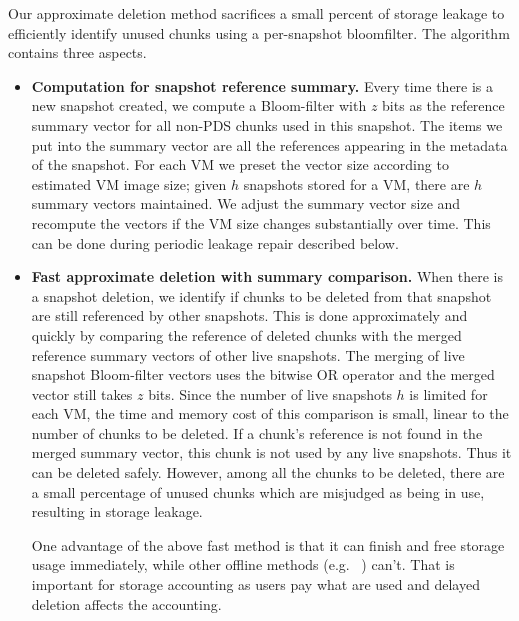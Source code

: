 Our approximate deletion method sacrifices a small percent of storage leakage
to efficiently identify unused chunks using a per-snapshot bloomfilter.
The algorithm contains three aspects.
\begin{itemize}
\item {\bf Computation for snapshot reference summary.}
Every time there is a new snapshot created,
we compute a Bloom-filter with $z$ bits as the reference summary vector for all non-PDS chunks used 
in this snapshot.
The items we put into the summary vector are all the references appearing in the metadata of the snapshot.
For each VM we preset the vector size according to estimated VM image size;
given $h$ snapshots stored for a VM, there are $h$ summary vectors maintained.
We adjust the summary vector size and recompute the vectors if the VM size changes substantially over time.
This can be done during periodic leakage repair described below.

\item {\bf Fast approximate deletion with summary comparison.}
When there is a snapshot deletion,  
we identify if chunks to be deleted from that snapshot
are still referenced by other snapshots. 
This is done approximately and quickly by comparing the 
reference of deleted chunks  with
the merged reference summary vectors of other live snapshots.
The merging of live snapshot Bloom-filter vectors uses the bitwise OR operator 
and the merged vector still takes $z$ bits.
Since the number of live snapshots $h$ is limited for
each VM, 
the time and memory cost of this comparison is small, linear to the number of chunks to be deleted.
If a chunk's reference is not found in the merged summary vector, 
this chunk is not used by any live snapshots. Thus it can be deleted safely.
However, among all the chunks to be deleted, 
there are a small percentage of unused chunks  which
are misjudged as  being in use, resulting in storage leakage.

One advantage of the above fast method is that it can finish  and free storage 
usage immediately, while other offline methods (e.g. ~\cite{Guo2011,Fabiano2013})
can't. That is important for storage accounting as users pay what are used and delayed deletion
affects the accounting.


\end{itemize}
